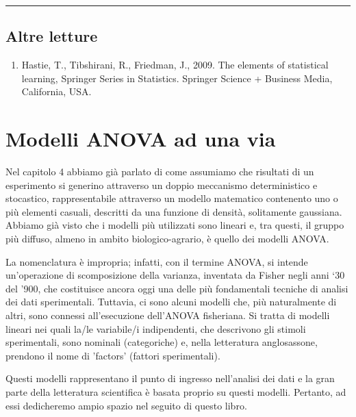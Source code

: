 \documentclass[a4paper,12pt,oneside]{book}
\providecommand{\tightlist}{%
  \setlength{\itemsep}{0pt}\setlength{\parskip}{0pt}}
\begin{document}
\begin{center}\rule{0.5\linewidth}{0.5pt}\end{center}

\hypertarget{altre-letture-5}{%
\section{Altre letture}\label{altre-letture-5}}

\begin{enumerate}
\def\labelenumi{\arabic{enumi}.}
\tightlist
\item
  Hastie, T., Tibshirani, R., Friedman, J., 2009. The elements of statistical learning, Springer Series in Statistics. Springer Science + Business Media, California, USA.
\end{enumerate}

\hypertarget{modelli-anova-ad-una-via}{%
\chapter{Modelli ANOVA ad una via}\label{modelli-anova-ad-una-via}}

Nel capitolo 4 abbiamo già parlato di come assumiamo che risultati di un esperimento si generino attraverso un doppio meccanismo deterministico e stocastico, rappresentabile attraverso un modello matematico contenento uno o più elementi casuali, descritti da una funzione di densità, solitamente gaussiana. Abbiamo già visto che i modelli più utilizzati sono lineari e, tra questi, il gruppo più diffuso, almeno in ambito biologico-agrario, è quello dei modelli ANOVA.

La nomenclatura è impropria; infatti, con il termine ANOVA, si intende un'operazione di scomposizione della varianza, inventata da Fisher negli anni `30 del '900, che costituisce ancora oggi una delle più fondamentali tecniche di analisi dei dati sperimentali. Tuttavia, ci sono alcuni modelli che, più naturalmente di altri, sono connessi all'esecuzione dell'ANOVA fisheriana. Si tratta di modelli lineari nei quali la/le variabile/i indipendenti, che descrivono gli stimoli sperimentali, sono nominali (categoriche) e, nella letteratura anglosassone, prendono il nome di 'factors' (fattori sperimentali).

Questi modelli rappresentano il punto di ingresso nell'analisi dei dati e la gran parte della letteratura scientifica è basata proprio su questi modelli. Pertanto, ad essi dedicheremo ampio spazio nel seguito di questo libro.
\end{document}
